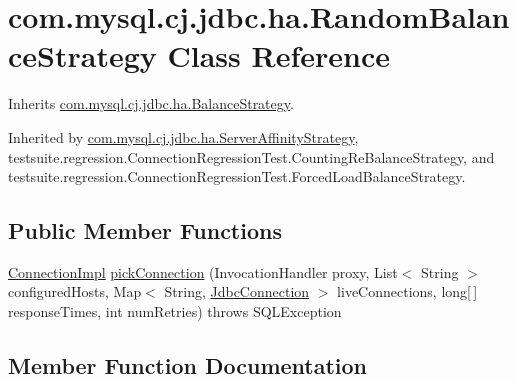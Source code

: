 \hypertarget{classcom_1_1mysql_1_1cj_1_1jdbc_1_1ha_1_1_random_balance_strategy}{}\section{com.\+mysql.\+cj.\+jdbc.\+ha.\+Random\+Balance\+Strategy Class Reference}
\label{classcom_1_1mysql_1_1cj_1_1jdbc_1_1ha_1_1_random_balance_strategy}


Inherits \mbox{\hyperlink{interfacecom_1_1mysql_1_1cj_1_1jdbc_1_1ha_1_1_balance_strategy}{com.\+mysql.\+cj.\+jdbc.\+ha.\+Balance\+Strategy}}.



Inherited by \mbox{\hyperlink{classcom_1_1mysql_1_1cj_1_1jdbc_1_1ha_1_1_server_affinity_strategy}{com.\+mysql.\+cj.\+jdbc.\+ha.\+Server\+Affinity\+Strategy}}, testsuite.\+regression.\+Connection\+Regression\+Test.\+Counting\+Re\+Balance\+Strategy, and testsuite.\+regression.\+Connection\+Regression\+Test.\+Forced\+Load\+Balance\+Strategy.

\subsection*{Public Member Functions}
\begin{DoxyCompactItemize}
\item 
\mbox{\hyperlink{classcom_1_1mysql_1_1cj_1_1jdbc_1_1_connection_impl}{Connection\+Impl}} \mbox{\hyperlink{classcom_1_1mysql_1_1cj_1_1jdbc_1_1ha_1_1_random_balance_strategy_aefbfa275d5d20205e6eb812224da5a2c}{pick\+Connection}} (Invocation\+Handler proxy, List$<$ String $>$ configured\+Hosts, Map$<$ String, \mbox{\hyperlink{interfacecom_1_1mysql_1_1cj_1_1jdbc_1_1_jdbc_connection}{Jdbc\+Connection}} $>$ live\+Connections, long\mbox{[}$\,$\mbox{]} response\+Times, int num\+Retries)  throws S\+Q\+L\+Exception 
\end{DoxyCompactItemize}


\subsection{Member Function Documentation}
\mbox{\label{classcom_1_1mysql_1_1cj_1_1jdbc_1_1ha_1_1_random_balance_strategy_aefbfa275d5d20205e6eb812224da5a2c}} 
